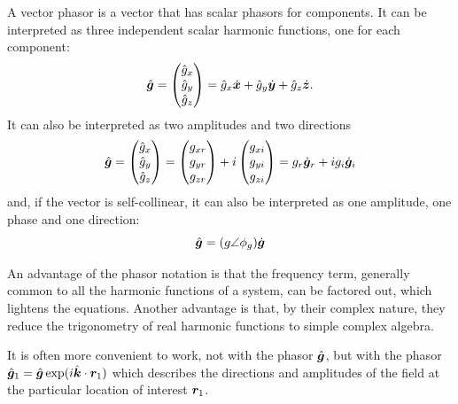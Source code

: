 A vector phasor is a vector that has scalar phasors for components.
It can be interpreted as three independent scalar harmonic functions, one for each component:
\begin{equation}
    \hat{\bm{g}} =
    \begin{pmatrix}
        \hat{g}_x \\ \hat{g}_y \\ \hat{g}_z
    \end{pmatrix}
    =
    \hat{g}_x \dot{\bm{x}} + \hat{g}_y \dot{\bm{y}} + \hat{g}_z \dot{\bm{z}}
    \text{.}
\end{equation}
It can also be interpreted as two amplitudes and two directions
\begin{equation}
    \hat{\bm{g}} =
    \begin{pmatrix}
        \hat{g}_x \\ \hat{g}_y \\ \hat{g}_z
    \end{pmatrix}
    =
    \begin{pmatrix}
        g_{xr} \\ g_{yr} \\ g_{zr}
    \end{pmatrix}
    +
    i
    \begin{pmatrix}
        g_{xi} \\ g_{yi} \\ g_{zi}
    \end{pmatrix}
    =
    g_r \dot{\bm{g}}_r
    +
    i
    g_i \dot{\bm{g}}_i
\end{equation}
and, if the vector is self-collinear, it can also be interpreted as one amplitude, one phase and one direction:
\begin{equation}
    \hat{\bm{g}} = (g \angle \phi_g) \dot{\bm{g}}
\end{equation}

An advantage of the phasor notation is that the frequency term, generally common to all the harmonic functions of a system, can be factored out, which lightens the equations.
Another advantage is that, by their complex nature, they reduce the trigonometry of real harmonic functions to simple complex algebra.

It is often more convenient to work, not with the phasor $\hat{\bm{g}}$,
but with the phasor $\hat{\bm{g}}_1 = \hat{\bm{g}} \exp(i \hat{\bm{k}} \cdot \bm{r}_1)$
which describes the directions and amplitudes of the field at the particular location of interest $\bm{r}_1$.

